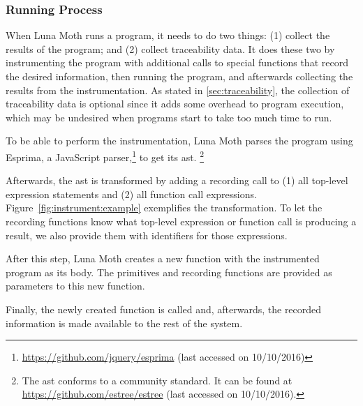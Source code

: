 \subsubsection{Running Process}
When Luna Moth runs a program, it needs to do two things: (1) collect the results of the program; and (2) collect traceability data.
It does these two by instrumenting the program with additional calls to special functions that record the desired information, then running the program, and afterwards collecting the results from the instrumentation.
As stated in \ref{sec:traceability}, the collection of traceability data is optional since it adds some overhead to program execution, which may be undesired when programs start to take too much time to run.

To be able to perform the instrumentation, Luna Moth parses the program using Esprima, a JavaScript parser,\footnote{\url{https://github.com/jquery/esprima} (last accessed on 10/10/2016)} to get its \gls{ast}.%
\footnote{The \gls{ast} conforms to a community standard. It can be found at \url{https://github.com/estree/estree} (last accessed on 10/10/2016).}

Afterwards, the \gls{ast} is transformed by adding a recording call to (1) all top-level expression statements and (2) all function call expressions.
Figure~\ref{fig:instrument:example} exemplifies the transformation.
To let the recording functions know what top-level expression or function call is producing a result, we also provide them with identifiers for those expressions.

After this step, Luna Moth creates a new function with the instrumented program as its body.
The primitives and recording functions are provided as parameters to this new function.

Finally, the newly created function is called and, afterwards, the recorded information is made available to the rest of the system.

